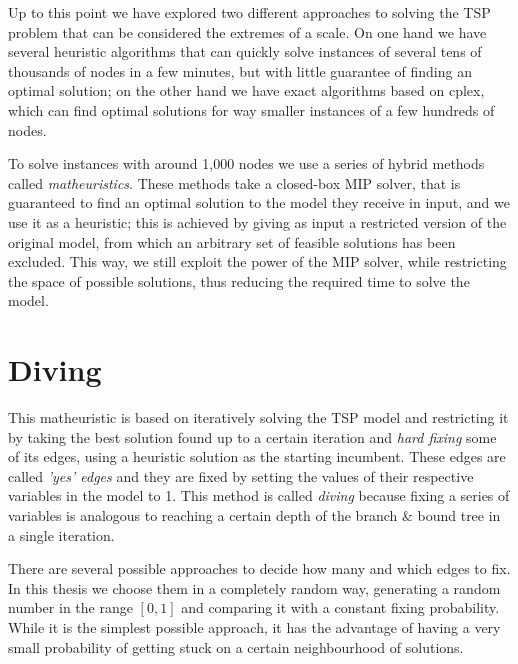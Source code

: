 Up to this point we have explored two different approaches to solving the TSP problem that can be considered the extremes of a scale. On one hand we have several heuristic algorithms that can quickly solve instances of several tens of thousands of nodes in a few minutes, but with little guarantee of finding an optimal solution; on the other hand we have exact algorithms based on cplex, which can find optimal solutions for way smaller instances of a few hundreds of nodes.

To solve instances with around 1,000 nodes we use a series of hybrid methods called \textit{matheuristics}. These methods take a closed-box MIP solver, that is guaranteed to find an optimal solution to the model they receive in input, and we use it as a heuristic; this is achieved by giving as input a restricted version of the original model, from which an arbitrary set of feasible solutions has been excluded. This way, we still exploit the power of the MIP solver, while restricting the space of possible solutions, thus reducing the required time to solve the model.

\section{Diving}

This matheuristic is based on iteratively solving the TSP model and restricting it by taking the best solution found up to a certain iteration and \textit{hard fixing} some of its edges, using a heuristic solution as the starting incumbent. These edges are called \textit{'yes' edges} and they are fixed by setting the values of their respective variables in the model to 1. This method is called \textit{diving} because fixing a series of variables is analogous to reaching a certain depth of the branch \& bound tree in a single iteration.

There are several possible approaches to decide how many and which edges to fix. In this thesis we choose them in a completely random way, generating a random number in the range $[0,1]$ and comparing it with a constant fixing probability. While it is the simplest possible approach, it has the advantage of having a very small probability of getting stuck on a certain neighbourhood of solutions.

\FloatBarrier
